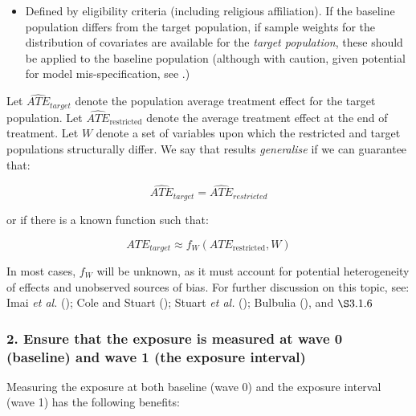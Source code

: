 \documentclass[
  singlecolumn]{article}
\providecommand{\tightlist}{%
  \setlength{\itemsep}{0pt}\setlength{\parskip}{0pt}}\usepackage{longtable,booktabs,array}
\begin{document}
\begin{itemize}
\tightlist
\item
  Defined by eligibility criteria (including religious affiliation). If
  the baseline population differs from the target population, if sample
  weights for the distribution of covariates are available for the
  \emph{target population}, these should be applied to the baseline
  population (although with caution, given potential for model
  mis-specification, see .)
\end{itemize}

Let \(\widehat{ATE}_{target}\) denote the population average treatment
effect for the target population. Let
\(\widehat{ATE}_{\text{restricted}}\) denote the average treatment
effect at the end of treatment. Let \(W\) denote a set of variables upon
which the restricted and target populations structurally differ. We say
that results \emph{generalise} if we can guarantee that:

\[
\widehat{ATE}_{target} =  \widehat{ATE}_{restricted} 
\]

or if there is a known function such that:

\[
ATE_{target}\approx  f_W(ATE_{\text{restricted}}, W)
\]

In most cases, \(f_W\) will be unknown, as it must account for potential
heterogeneity of effects and unobserved sources of bias. For further
discussion on this topic, see: Imai \emph{et al.}
(); Cole and Stuart
(); Stuart \emph{et al.}
(); Bulbulia
(), and \(\S 3.1.6\)

\subsubsection{2. Ensure that the exposure is measured at wave 0
(baseline) and wave 1 (the exposure
interval)}\label{ensure-that-the-exposure-is-measured-at-wave-0-baseline-and-wave-1-the-exposure-interval}

Measuring the exposure at both baseline (wave 0) and the exposure
interval (wave 1) has the following benefits:
\end{document}
